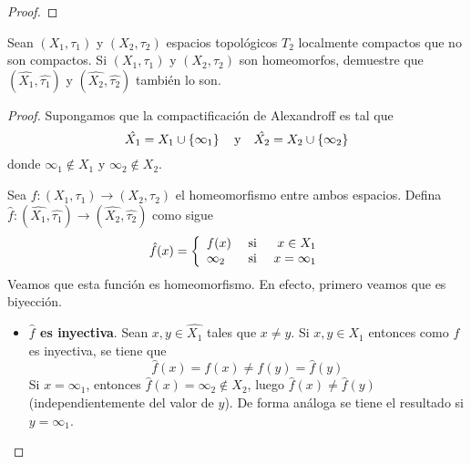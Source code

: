 \documentclass[12pt]{report}
\theoremstyle{largebreak}
\newcommand\cf[3]{\ensuremath{#1:#2\rightarrow#3}}
\begin{document}
    \begin{proof}
        
    \end{proof}
        
    \begin{excer}
        Sean $(X_1,\tau_1)$ y $(X_2,\tau_2)$ espacios topológicos $T_2$ localmente compactos que no son compactos. Si $(X_1,\tau_1)$ y $(X_2,\tau_2)$ son homeomorfos, demuestre que $(\hat{X_1},\hat{\tau_1})$ y $(\hat{X_2},\hat{\tau_2})$ también lo son.
    \end{excer}
    
    \begin{proof}
        Supongamos que la compactificación de Alexandroff es tal que
        \begin{equation*}
            \hat{X_1}=X_1\cup\left\{\infty_1 \right\}\quad\textup{y}\quad\hat{X_2}=X_2\cup\left\{\infty_2 \right\}
        \end{equation*}
        donde $\infty_1\notin X_1$ y $\infty_2\notin X_2$.

        Sea $\cf{f}{(X_1,\tau_1)}{(X_2,\tau_2)}$ el homeomorfismo entre ambos espacios. Defina $\cf{\hat{f}}{(\hat{X_1},\hat{\tau_1})}{(\hat{X_2},\hat{\tau_2})}$ como sigue
        \begin{equation*}
            \hat{f}(x)=\left\{ 
                \begin{array}{lcr}
                    f(x) & \textup{ si } & x\in X_1\\
                    \infty_2 & \textup{ si } & x=\infty_1\\
                \end{array}
            \right.
        \end{equation*}
        Veamos que esta función es homeomorfismo. En efecto, primero veamos que es biyección.
        \begin{itemize}
            \item \textbf{$\hat{f}$ es inyectiva}. Sean $x,y\in \hat{X_1}$ tales que $x\neq y$. Si $x,y\in X_1$ entonces como $f$ es inyectiva, se tiene que
            \begin{equation*}
                \hat{f}(x)=f(x)\neq f(y)=\hat{f}(y)
            \end{equation*}
            Si $x=\infty_1$, entonces $\hat{f}(x)=\infty_2\notin X_2$, luego $\hat{f}(x)\neq \hat{f}(y)$ (independientemente del valor de $y$). De forma análoga se tiene el resultado si $y=\infty_1$.
            

\end{itemize}
\end{proof}
\end{document}
